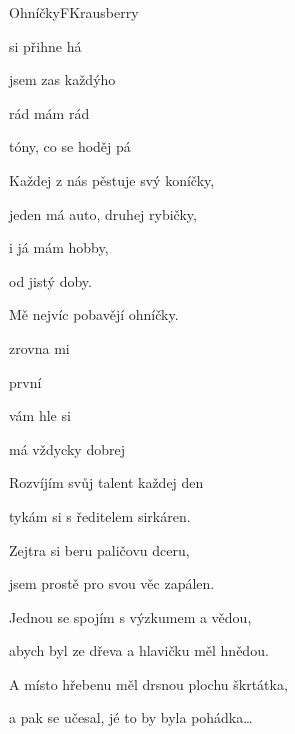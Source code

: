 \setcounter{page}{60}
\begin{song}{Ohníčky}{F}{Krausberry}

\begin{SBVerse}

 si  přihne há

jsem zas každýho 

 rád  mám rád 

tóny, co se hoděj  pá

\end{SBVerse}

\begin{SBVerse}

Každej z nás pěstuje svý koníčky,

jeden má auto, druhej rybičky,

i já mám hobby,

od jistý doby.

Mě nejvíc pobavějí ohníčky.

\end{SBVerse}

\begin{SBChorus*}

zrovna  mi  

první   

 vám  hle si 

 má vždycky dobrej  

\end{SBChorus*}

\begin{SBVerse}

Rozvíjím svůj talent každej den

tykám si s ředitelem sirkáren.

Zejtra si beru paličovu dceru,

jsem prostě pro svou věc zapálen.

\end{SBVerse}

\begin{SBChorus*}

Jednou se spojím s výzkumem a vědou,

abych byl ze dřeva a hlavičku měl hnědou.

A místo hřebenu měl drsnou plochu škrtátka,

a pak se učesal, jé to by byla pohádka…

\end{SBChorus*}

\end{song}

\pagebreak
